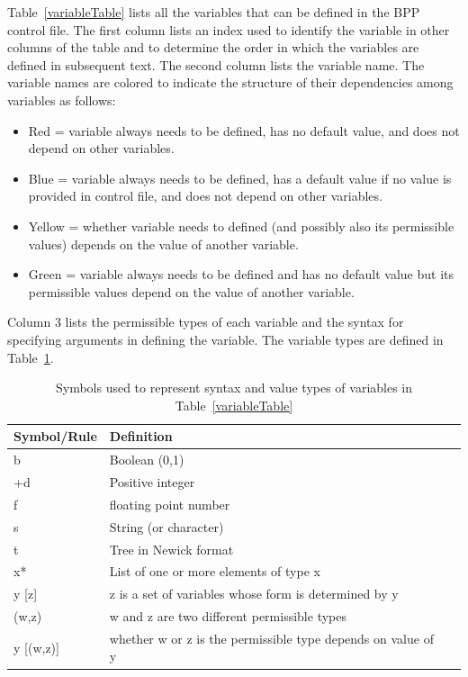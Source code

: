 \documentclass[a4paper]{book}
\numberwithin{equation}{section} \renewcommand{\baselinestretch}{0.55}
\begin{document}
Table~\ref{variableTable} lists all the variables that can be defined
in the BPP control file.  The first column lists an index used to
identify the variable in other columns of the table and to determine
the order in which the variables are defined in subsequent text. The
second column lists the variable name. The variable names are colored
to indicate the structure of their dependencies among variables as
follows:
\begin{itemize}
\item {\color{red} Red = variable always needs to be defined, has no
    default value, and does not depend on other variables.}
\item {\color{blue} Blue = variable always needs to be defined, has a
    default value if no value is provided in control file, and does
    not depend on other variables.}
\item {\color{yellow1} Yellow = whether variable needs to defined (and
    possibly also its permissible values) depends on the value of
    another variable.}
\item {\color{green1} Green = variable always needs to be defined and
    has no default value but its permissible values depend on the
    value of another variable.}
\end{itemize}
Column 3 lists the permissible types of each variable and the syntax
for specifying arguments in defining the variable. The variable types
are defined in Table~\ref{symbolTable}.
\begin{table}
  \begin{tabular}{@{}llr@{}}
    \toprule
    Symbol/Rule & Definition \\ \midrule
    b & Boolean (0,1) \\
    +d & Positive integer \\
    f & floating point number \\
    s & String (or character) \\
    t & Tree in Newick format \\
    x* & List of one or more elements of type x \\
    y [z] & z is a set of variables whose form is determined by y \\
    (w,z) & w and z are two different permissible types \\
    y [(w,z)] & whether w or z is the permissible type depends on value of y \\          
    \bottomrule
  \end{tabular}
  \caption{Symbols used to represent syntax and value types of
    variables in Table~\ref{variableTable}}
  \label{symbolTable}
\end{table}
\end{document}
